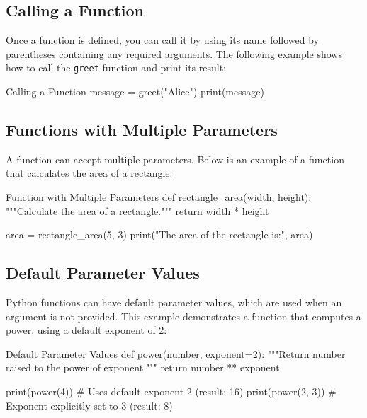 %
\subsection{Calling a Function}
Once a function is defined, you can call it by using its name followed by parentheses containing any required arguments. The following example shows how to call the \texttt{greet} function and print its result:

\begin{codeonly}{Calling a Function}
message = greet("Alice")
print(message)
\end{codeonly}

%
\subsection{Functions with Multiple Parameters}
A function can accept multiple parameters. Below is an example of a function that calculates the area of a rectangle:

\begin{codeonly}{Function with Multiple Parameters}
def rectangle_area(width, height):
    """Calculate the area of a rectangle."""
    return width * height

area = rectangle_area(5, 3)
print("The area of the rectangle is:", area)
\end{codeonly}

%
\subsection{Default Parameter Values}
Python functions can have default parameter values, which are used when an argument is not provided. This example demonstrates a function that computes a power, using a default exponent of 2:

\begin{codeonly}{Default Parameter Values}
def power(number, exponent=2):
    """Return number raised to the power of exponent."""
    return number ** exponent

print(power(4))    # Uses default exponent 2 (result: 16)
print(power(2, 3)) # Exponent explicitly set to 3 (result: 8)
\end{codeonly}


